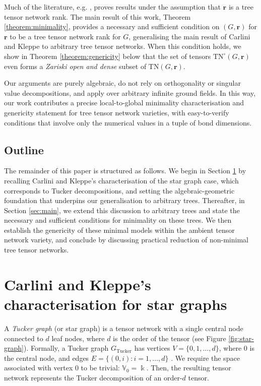 \documentclass{amsart}
\theoremstyle{plain}
\theoremstyle{definition}
\theoremstyle{remark}
\begin{document}
Much of the literature, e.g. \cite{holtzManifoldsTensorsFixed2012, USCHMAJEW2013133, Haegeman2014GeometryMPS}, proves results under the assumption that $\mathbf r$ is a tree tensor network rank. The main result of this work, Theorem \ref{theorem:minimality}, provides a necessary and sufficient condition on $(G, \mathbf r)$ for $\mathbf r$ to be a tree tensor network rank for $G$, generalising the main result of Carlini and Kleppe \cite{carlinikleppe} to arbitrary tree tensor networks. When this condition holds, we show in Theorem \ref{theorem:genericity} below that the set of tensors $\mathrm{TN}^\circ(G, \mathbf r)$ even forms a \textit{Zariski open and dense} subset of $ \mathrm{TN}(G, \mathbf{r}) $. 

Our arguments are purely algebraic, do not rely on orthogonality or singular value decompositions, and apply over arbitrary infinite ground fields. In this way, our work contributes a precise local-to-global minimality characterisation and genericity statement for tree tensor network varieties, with easy-to-verify conditions that involve only the numerical values in a tuple of bond dimensions.

\subsection{Outline}
The remainder of this paper is structured as follows. We begin in Section \ref{sec:star_graphs} by recalling Carlini and Kleppe's characterisation of the star graph case, which corresponds to Tucker decompositions, and setting the algebraic-geometric foundation that underpins our generalisation to arbitrary trees. Thereafter, in Section \ref{sec:main}, we extend this discussion to arbitrary trees and state the necessary and sufficient conditions for minimality on these trees. We then establish the genericity of these minimal models within the ambient tensor network variety, and conclude by discussing practical reduction of non-minimal tree tensor networks.

\section{Carlini and Kleppe's characterisation for star graphs}\label{sec:star_graphs}
A \textit{Tucker graph} (or star graph) is a tensor network with a single central node connected to $d$ leaf nodes, where $d$ is the order of the tensor (see Figure \ref{fig:star-graph}). Formally, a Tucker graph $G_{\text{Tucker}}$ has vertices $V = \{0, 1, \dots, d\}$, where $0$ is the central node, and edges $E = \{(0, i) : i = 1, \dots, d\}$ \cite{limandye}. We require the space associated with vertex $0$ to be trivial: $\mathbb{V}_0=\Bbbk$. Then, the resulting tensor network represents the Tucker decomposition of an order-$d$ tensor. 
\end{document}
